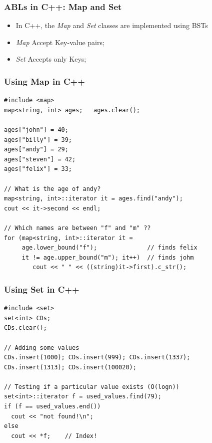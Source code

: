 \documentclass{beamer}
\begin{document}
\begin{frame}
  \frametitle{ABLs in C++: Map and Set}

  \begin{itemize}
  \item In C++, the \emph{Map} and \emph{Set} classes are implemented
    using BSTs
  \item \emph{Map} Accept Key-value pairs;
  \item \emph{Set} Accepts only Keys;
  \end{itemize}
  
\end{frame}

\begin{frame}[fragile]
  \frametitle{Using Map in C++}
  {\small
\begin{verbatim}
#include <map>
map<string, int> ages;   ages.clear();

ages["john"] = 40;   
ages["billy"] = 39;  
ages["andy"] = 29;   
ages["steven"] = 42; 
ages["felix"] = 33;  

// What is the age of andy?
map<string, int>::iterator it = ages.find("andy");
cout << it->second << endl;

// Which names are between "f" and "m" ?? 
for (map<string, int>::iterator it = 
     age.lower_bound("f");              // finds felix
     it != age.upper_bound("m"); it++)  // finds johm
        cout << " " << ((string)it->first).c_str();
\end{verbatim}}
\end{frame}


\begin{frame}[fragile]
  \frametitle{Using Set in C++}
  {\small
\begin{verbatim}
#include <set>
set<int> CDs;      
CDs.clear();

// Adding some values
CDs.insert(1000); CDs.insert(999); CDs.insert(1337);
CDs.insert(1313); CDs.insert(100020);

// Testing if a particular value exists (O(logn))
set<int>::iterator f = used_values.find(79);
if (f == used_values.end())
  cout << "not found!\n";
else
  cout << *f;    // Index!
\end{verbatim}}
\end{frame}
\end{document}
